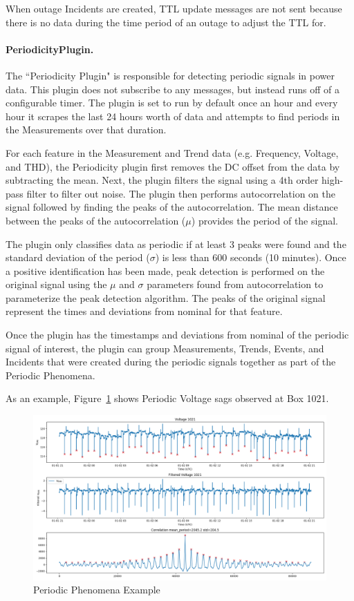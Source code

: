 When outage Incidents are created, TTL update messages are not sent because there is no data during the time period of an outage to adjust the TTL for.

\paragraph{PeriodicityPlugin.}

The ``Periodicity Plugin" is responsible for detecting periodic signals in power data. This plugin does not subscribe to any messages, but instead runs off of a configurable timer. The plugin is set to run by default once an hour and every hour it scrapes the last 24 hours worth of data and attempts to find periods in the Measurements over that duration.

For each feature in the Measurement and Trend data (e.g. Frequency, Voltage, and THD), the Periodicity plugin first removes the DC offset from the data by subtracting the mean. Next, the plugin filters the signal using a 4th order high-pass filter to filter out noise. The plugin then performs autocorrelation on the signal followed by finding the peaks of the autocorrelation. The mean distance between the peaks of the autocorrelation ($\mu$) provides the period of the signal.

The plugin only classifies data as periodic if at least 3 peaks were found and the standard deviation of the period ($\sigma$) is less than 600 seconds (10 minutes). Once a positive identification has been made, peak detection is performed on the original signal using the $\mu$ and $\sigma$ parameters found from autocorrelation to parameterize the peak detection algorithm. The peaks of the original signal represent the times and deviations from nominal for that feature.

Once the plugin has the timestamps and deviations from nominal of the periodic signal of interest, the plugin can group Measurements, Trends, Events, and Incidents that were created during the periodic signals together as part of the Periodic Phenomena.

As an example, Figure~\ref{fig:periodic_example} shows Periodic Voltage sags observed at Box 1021.

\begin{figure}[h]
	\centering
	\includegraphics[width=\linewidth]{figures/periodic_example.png}
	\caption{Periodic Phenomena Example}
	\label{fig:periodic_example}
\end{figure}

